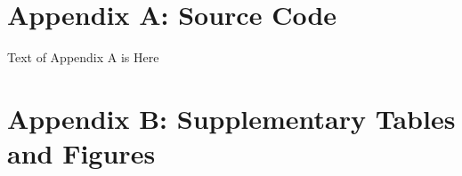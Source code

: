 \documentclass[Report.tex]{subfiles}
\begin{document}
\newpage
\appendix
\section{Appendix A: Source Code} \label{App:AppendixA}
\setcounter{table}{0}
\setcounter{figure}{0}
\renewcommand{\thetable}{A\arabic{table}}
\renewcommand{\thefigure}{A\arabic{figure}}

Text of Appendix A is Here

\newpage
\section{Appendix B: Supplementary Tables and Figures}
\setcounter{table}{0}
\setcounter{figure}{0}
\renewcommand{\thetable}{B\arabic{table}}
\renewcommand{\thefigure}{B\arabic{figure}}
\end{document}

